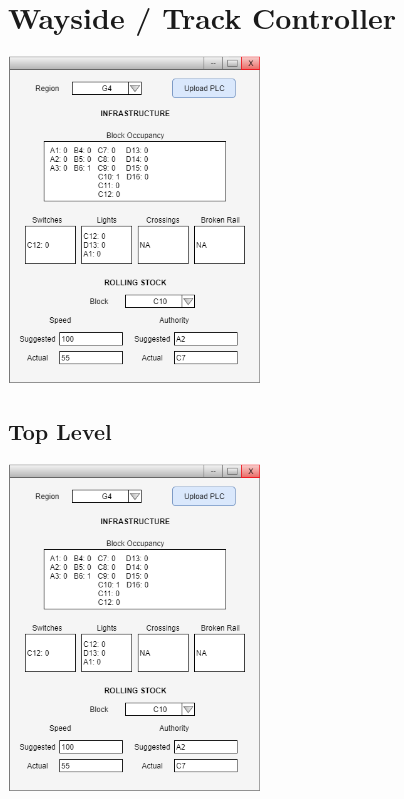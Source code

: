\documentclass{scrreprt}
\begin{document}


\chapter{Wayside / Track Controller}
\begin{center}
    \includegraphics[width=0.5\textwidth]{wc-ui}
\end{center}



\section{Top Level}
\begin{center}
    \includegraphics[trim = {.0 7.7cm 0cm 0cm }, clip, width=0.5\textwidth]{wc-ui}
\end{center}
\end{document}
